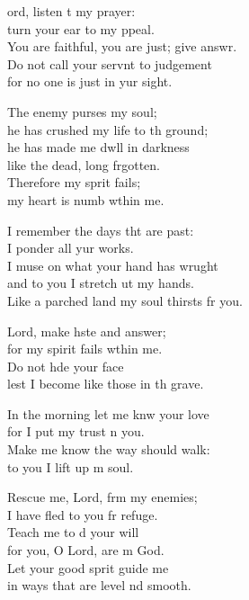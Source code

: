 \settowidth{\versewidth}{You are faithful, you are just; give answer. +}
\begin{psalmverse}%
  \begin{patverse}
    ord, listen t my prayer:\Med\\
    turn your ear to my ppeal.\\
    You are faithful, you are just; give answr.\Flex\\
    Do not call your servnt to judgement\\
    for no one is just in yur sight.

    The enemy purses my soul;\Med\\
    he has crushed my life to th ground;\\
    he has made me dwll in darkness\Med\\
    like the dead, long frgotten.\\
    Therefore my sp\pointup{\i}rit fails;\Med\\
    my heart is numb w\pointup{\i}thin me.

    I remember the days tht are past:\Med\\
    I ponder all yur works.\\
    I muse on what your hand has wrught\Flex\\
    and to you I stretch ut my hands.\Med\\
    Like a parched land my soul thirsts fr you.

    Lord, make hste and answer;\Med\\
    for my spirit fails w\pointup{\i}thin me.\\
    Do not h\pointup{\i}de your face\Med\\
    lest I become like those in th grave.

    In the morning let me knw your love\Med\\
    for I put my trust \pointup{\i}n you.\\
    Make me know the way  should walk:\Med\\
    to you I lift up m soul.

    Rescue me, Lord, frm my enemies;\Med\\
    I have fled to you fr refuge.\\
    Teach me to d your will\Med\\
    for you, O Lord, are m God.\\
    Let your good sp\pointup{\i}rit guide me\Med\\
    in ways that are level nd smooth.


\end{patverse}
\end{psalmverse}
